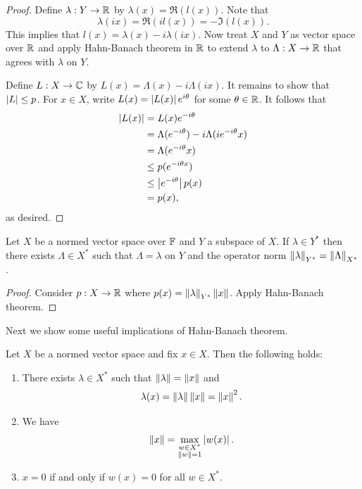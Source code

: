 \documentclass[a4paper]{article}
\begin{document}
\begin{proof}

  Define $\lambda: Y \to \mathbb{R}$ by $\lambda(x) = \Re(l(x))$. Note that
  \[
    \lambda(i x) = \Re(i l(x)) = - \Im(l (x)).
  \]
  This implies that $l(x) = \lambda(x) - i \lambda(i x)$. Now treat $X$
  and $Y$ as vector space over $\mathbb{R}$ and apply Hahn-Banach theorem in $\mathbb{R}$
  to extend $\lambda$ to $\Lambda : X \to \mathbb{R}$ that agrees with $\lambda$
  on $Y$.

  Define $L: X \to \mathbb{C}$ by $L(x) = \Lambda(x) - i \Lambda(i x)$. It remains
  to show that $\left\lvert L\right\rvert \leq p$. For $x \in X$, write $L(x) = \left\lvert L(x)\right\rvert
  e^{i \theta}$ for some $\theta \in \mathbb{R}$. It follows that
  \[
    \begin{aligned}
      \left\lvert L(x)\right\rvert
       & = L(x) e^{- i \theta}                                     \\
       & = \Lambda(e^{- i \theta}) - i \Lambda(i e^{- i \theta} x) \\
       & = \Lambda(e^{- i \theta} x)                               \\
       & \leq p(e^{- i \theta x})                                  \\
       & \leq \left\lvert e^{- i \theta}\right\rvert p(x)                            \\
       & = p(x),
    \end{aligned}
  \]
  as desired.

\end{proof}

\begin{thm}
  Let $X$ be a normed vector space over $\mathbb{F}$ and $Y$ a subspace
  of $X$. If $\lambda \in Y^*$ then there exists
  $\Lambda \in X^*$ such that $\Lambda = \lambda$ on $Y$ and
  the operator norm
  $\left\lVert \lambda\right\rVert_{Y^*} = \left\lVert \Lambda\right\rVert_{X^*}$.
\end{thm}

\begin{proof}

  Consider $p: X \to \mathbb{R}$ where $p(x) = \left\lVert \lambda\right\rVert_{Y^*} \left\lVert x\right\rVert$.
  Apply Hahn-Banach theorem.

\end{proof}

Next we show some useful implications of Hahn-Banach theorem.

\begin{thm}
  Let $X$ be a normed vector space and fix $x \in X$. Then the following
  holds:
  \begin{enumerate}
    \item There exists $\lambda \in X^*$ such that $\left\lVert \lambda\right\rVert =
          \left\lVert x\right\rVert$ and
          \[
            \lambda(x) = \left\lVert \lambda\right\rVert \left\lVert x\right\rVert = \left\lVert x\right\rVert^2.
          \]
    \item We have
          \[
            \left\lVert x\right\rVert = \max_{\substack{w \in X^* \\ \left\lVert w\right\rVert = 1}}
            \left\lvert w(x)\right\rvert.
          \]
    \item $x = 0$ if and only if $w(x) = 0$ for all $w \in X^*$.
  \end{enumerate}
\end{thm}
\end{document}
